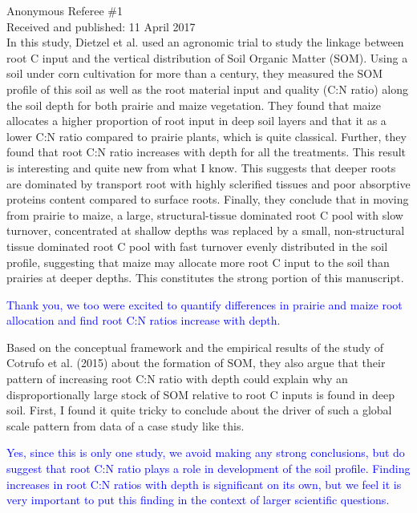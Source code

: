 \documentclass[]{article}
\title{}
\author{}
\date{}
\begin{document}
\maketitle

Anonymous Referee \#1\\
Received and published: 11 April 2017\\
In this study, Dietzel et al. used an agronomic trial to study the
linkage between root C input and the vertical distribution of Soil
Organic Matter (SOM). Using a soil under corn cultivation for more than
a century, they measured the SOM profile of this soil as well as the
root material input and quality (C:N ratio) along the soil depth for
both prairie and maize vegetation. They found that maize allocates a
higher proportion of root input in deep soil layers and that it as a
lower C:N ratio compared to prairie plants, which is quite classical.
Further, they found that root C:N ratio increases with depth for all the
treatments. This result is interesting and quite new from what I know.
This suggests that deeper roots are dominated by transport root with
highly sclerified tissues and poor absorptive proteins content compared
to surface roots. Finally, they conclude that in moving from prairie to
maize, a large, structural-tissue dominated root C pool with slow
turnover, concentrated at shallow depths was replaced by a small,
non-structural tissue dominated root C pool with fast turnover evenly
distributed in the soil profile, suggesting that maize may allocate more
root C input to the soil than prairies at deeper depths. This
constitutes the strong portion of this manuscript.

\textcolor{blue}{Thank you, we too were excited to quantify differences in prairie and maize root allocation and find root C:N ratios increase with depth.}

Based on the conceptual framework and the empirical results of the study
of Cotrufo et al. (2015) about the formation of SOM, they also argue
that their pattern of increasing root C:N ratio with depth could explain
why an disproportionally large stock of SOM relative to root C inputs is
found in deep soil. First, I found it quite tricky to conclude about the
driver of such a global scale pattern from data of a case study like
this.

\textcolor{blue}{Yes, since this is only one study, we avoid making any strong conclusions, but do suggest that root C:N ratio plays a role in development of the soil profile. Finding increases in root C:N ratios with depth is significant on its own, but we feel it is very important to put this finding in the context of larger scientific questions.}
\end{document}

